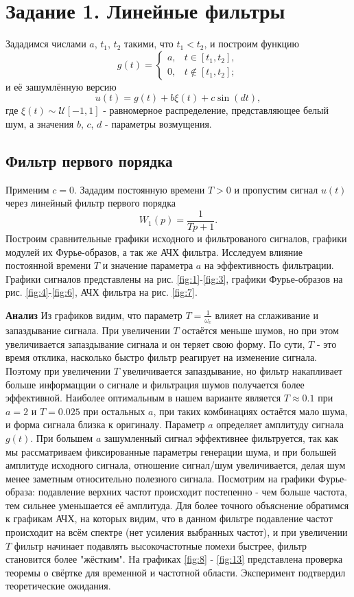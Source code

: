 \section{Задание 1. Линейные фильтры}
Зададимся числами $a$, $t_1$, $t_2$ такими, что $t_1 < t_2$, и построим функцию
\[
g(t) = 
\begin{cases}
a, & t \in [t_1, t_2], \\
0, & t \notin [t_1, t_2];
\end{cases}
\]
и её зашумлённую версию
\[
u(t) = g(t) + b\xi(t) + c \sin(dt),
\]
где $\xi(t) \sim \mathcal{U} [-1, 1]$ - равномерное распределение, представляющее белый шум, а значения $b$, $c$, $d$ - параметры возмущения.

\subsection{Фильтр первого порядка}
Применим $c=0$. Зададим постоянную времени $T>0$ и пропустим сигнал $u(t)$ через линейный фильтр первого порядка
$$
W_1(p)=\frac{1}{Tp+1}.
$$
Построим сравнительные графики исходного и фильтрованого сигналов, графики модулей их Фурье-образов, а так же АЧХ фильтра. Исследуем влияние постоянной времени $T$ и значение параметра $a$ на эффективность фильтрации.\newline
Графики сигналов представлены на рис. \ref{fig:1}-\ref{fig:3}, графики Фурье-образов на рис. \ref{fig:4}-\ref{fig:6}, АЧХ фильтра на рис. \ref{fig:7}.

\textbf{Анализ}
\newline
Из графиков видим, что параметр $T=\frac{1}{\omega_c}$ влияет на сглаживание и запаздывание сигнала. При увеличении $T$ остаётся меньше шумов, но при этом увеличивается запаздывание сигнала и он теряет свою форму. По сути, $T$ - это время отклика, насколько быстро фильтр реагирует на изменение сигнала. Поэтому при увеличении $T$ увеличивается запаздывание, но фильтр накапливает больше информацции о сигнале и фильтрация шумов получается более эффективной.
\newline
Наиболее оптимальным в нашем варианте является  $T\approx0.1$ при $a=2$ и $T=0.025$ при остальных $a$, при таких комбинациях остаётся мало шума, и форма сигнала близка к оригиналу.
\newline
Параметр $a$ определяет амплитуду сигнала $g(t)$. При большем $a$ зашумленный сигнал эффективнее фильтруется, так как мы рассматриваем фиксированные параметры генерации шума, и при большей амплитуде исходного сигнала, отношение сигнал/шум увеличивается, делая шум менее заметным относительно полезного сигнала.
\newline
Посмотрим на графики Фурье-образа: подавление верхних частот происходит постепенно - чем больше частота, тем сильнее уменьшается её амплитуда. Для более точного объяснение обратимся к графикам АЧХ, на которых видим, что в данном фильтре подавление частот происходит на всём спектре (нет усиления выбранных частот), и при увеличении $T$ фильтр начинает подавлять высокочастотные помехи быстрее, фильтр становится более "жёстким".
\newline
На графиках \ref{fig:8} - \ref{fig:13} представлена проверка теоремы о свёртке для временной и частотной области. Эксперимент подтвердил теоретические ожидания.


